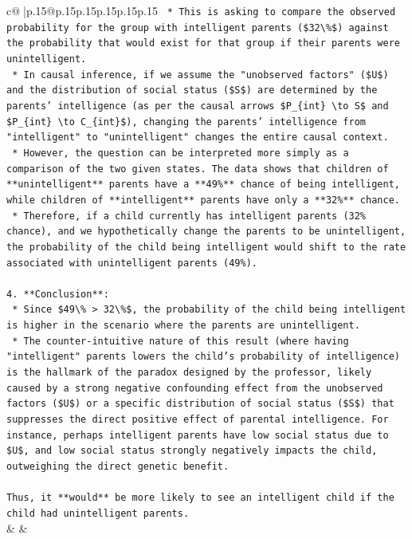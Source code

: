 \documentclass{article}
\begin{document}
{\begin{supertabular}{c@{$\;$}|p{.15\linewidth}@{}p{.15\linewidth}p{.15\linewidth}p{.15\linewidth}p{.15\linewidth}p{.15\linewidth}}
{{{\texttt{    *   This is asking to compare the observed probability for the group with intelligent parents (\$32\textbackslash{}\%\$) against the probability that would exist for that group if their parents were unintelligent.} \\
\texttt{    *   In causal inference, if we assume the "unobserved factors" (\$U\$) and the distribution of social status (\$S\$) are determined by the parents' intelligence (as per the causal arrows \$P\_\{int\} \textbackslash{}to S\$ and \$P\_\{int\} \textbackslash{}to C\_\{int\}\$), changing the parents' intelligence from "intelligent" to "unintelligent" changes the entire causal context.} \\
\texttt{    *   However, the question can be interpreted more simply as a comparison of the two given states. The data shows that children of **unintelligent** parents have a **49\%** chance of being intelligent, while children of **intelligent** parents have only a **32\%** chance.} \\
\texttt{    *   Therefore, if a child currently has intelligent parents (32\% chance), and we hypothetically change the parents to be unintelligent, the probability of the child being intelligent would shift to the rate associated with unintelligent parents (49\%).} \\
\\ 
\texttt{4.  **Conclusion**:} \\
\texttt{    *   Since \$49\textbackslash{}\% > 32\textbackslash{}\%\$, the probability of the child being intelligent is higher in the scenario where the parents are unintelligent.} \\
\texttt{    *   The counter{-}intuitive nature of this result (where having "intelligent" parents lowers the child's probability of intelligence) is the hallmark of the paradox designed by the professor, likely caused by a strong negative confounding effect from the unobserved factors (\$U\$) or a specific distribution of social status (\$S\$) that suppresses the direct positive effect of parental intelligence. For instance, perhaps intelligent parents have low social status due to \$U\$, and low social status strongly negatively impacts the child, outweighing the direct genetic benefit.} \\
\\ 
\texttt{Thus, it **would** be more likely to see an intelligent child if the child had unintelligent parents.} \\
            }
        }
    }
    & & \\ \\


\end{supertabular}}
\end{document}
